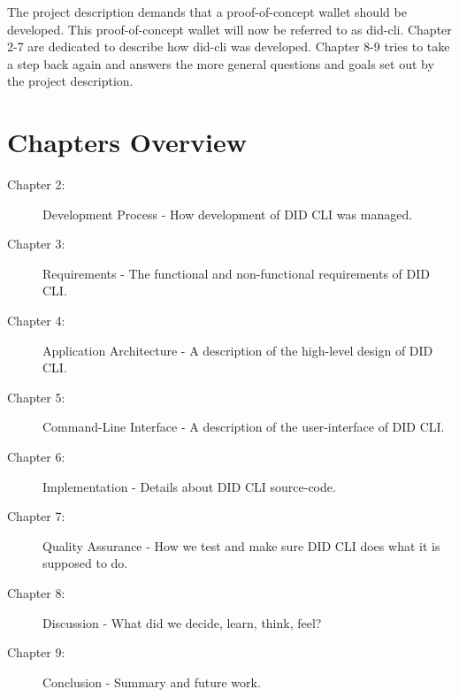 The project description demands that a proof-of-concept wallet should be developed. This proof-of-concept wallet will now be referred to as \acrfull{did-cli}. Chapter 2-7 are dedicated to describe how \acrshort{did-cli} was developed. Chapter 8-9 tries to take a step back again and answers the more general questions and goals set out by the project description.

\section{Chapters Overview}

\begin{description}
    \item[Chapter 2:] Development Process - How development of DID CLI was managed.
    \item[Chapter 3:] Requirements - The functional and non-functional requirements of DID CLI.
    \item[Chapter 4:] Application Architecture - A description of the high-level design of DID CLI.
    \item[Chapter 5:] Command-Line Interface - A description of the user-interface of DID CLI.
    \item[Chapter 6:] Implementation - Details about DID CLI source-code.
    \item[Chapter 7:] Quality Assurance - How we test and make sure DID CLI does what it is supposed to do. 
    \item[Chapter 8:] Discussion - What did we decide, learn, think, feel?
    \item[Chapter 9:] Conclusion - Summary and future work.
\end{description}
